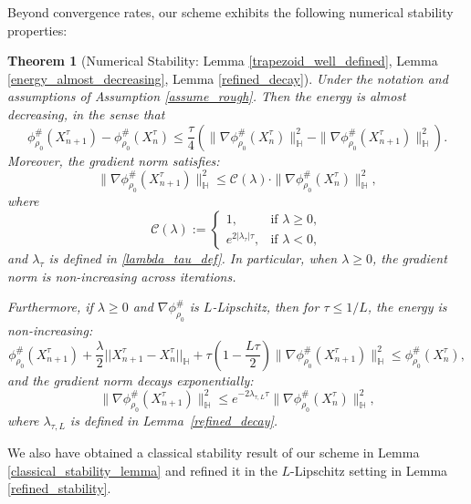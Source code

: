 \documentclass[11pt,a4paper]{amsart}
\newcommand{\1}{\mathds{1}}
\newtheorem{theorem}{\textbf{Theorem}}[section]
\numberwithin{equation}{section}
\begin{document}
\smallskip



Beyond convergence rates, our scheme exhibits the following numerical stability properties:

\begin{theorem}[Numerical Stability: Lemma \ref{trapezoid_well_defined}, Lemma \ref{energy_almost_decreasing}, Lemma \ref{refined_decay}]
Under the notation and assumptions of Assumption \ref{assume_rough}. Then the energy is \emph{almost decreasing}, in the sense that
\[
\phi^{\#}_{\rho_0}(X^{\tau}_{n+1}) - \phi^{\#}_{\rho_0}(X^{\tau}_n)
\leq \frac{\tau}{4} \left( \|\nabla \phi^{\#}_{\rho_0}(X^{\tau}_n)\|^2_{\mathbb{H}} - \|\nabla \phi^{\#}_{\rho_0}(X^{\tau}_{n+1})\|^2_{\mathbb{H}} \right).
\]
Moreover, the gradient norm satisfies:
\[
\|\nabla \phi^{\#}_{\rho_0}(X^{\tau}_{n+1})\|^2_{\mathbb{H}} \leq \mathcal{C}(\lambda) \cdot \|\nabla \phi^{\#}_{\rho_0}(X^{\tau}_n)\|^2_{\mathbb{H}},
\]
where
\[
\mathcal{C}(\lambda) :=
\begin{cases}
1, & \text{if } \lambda \geq 0, \\
e^{2 |\lambda_{\tau}| \tau}, & \text{if } \lambda < 0,
\end{cases}
\]
and $\lambda_{\tau}$ is defined in \eqref{lambda_tau_def}. In particular, when $\lambda \geq 0$, the gradient norm is non-increasing across iterations.

\smallskip

Furthermore, if $\lambda \geq 0$ and $\nabla \phi^{\#}_{\rho_0}$ is $L$-\textnormal{Lipschitz}, then for $\tau \leq 1/L$, the energy is \emph{non-increasing}:
\[
\phi^{\#}_{\rho_0}(X^{\tau}_{n+1}) + \frac{\lambda}{2} ||X^{\tau}_{n+1}-X^{\tau}_n||_{\mathbb{H}} + \tau \left( 1 - \frac{L \tau}{2} \right) \|\nabla \phi^{\#}_{\rho_0}(X^{\tau}_{n+1})\|^2_{\mathbb{H}} \leq \phi^{\#}_{\rho_0}(X^{\tau}_n),
\]
and the \emph{gradient norm decays exponentially}:
\[
\|\nabla \phi^{\#}_{\rho_0}(X^{\tau}_{n+1})\|^2_{\mathbb{H}} \leq e^{-2 \lambda_{\tau,L} \tau} \|\nabla \phi^{\#}_{\rho_0}(X^{\tau}_n)\|^2_{\mathbb{H}},
\]
where $\lambda_{\tau,L}$ is defined in Lemma~\ref{refined_decay}.
\end{theorem}

We also have obtained a classical stability result of our scheme in Lemma \ref{classical_stability_lemma} and refined it in the $L$-Lipschitz setting in Lemma \ref{refined_stability}. \smallskip
\end{document}
